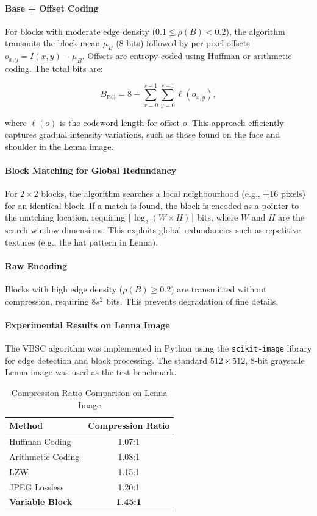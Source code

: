\paragraph{Base + Offset Coding} For blocks with moderate edge density ($0.1 \le \rho(B) < 0.2$), the algorithm\cite{Salomon1997} transmits the block mean $\mu_B$ (8 bits) followed by per‑pixel offsets $o_{x,y} = I(x,y) - \mu_B$. Offsets are entropy‑coded using Huffman or arithmetic coding. The total bits are:

\[
B_{\text{BO}} = 8 + \sum_{x=0}^{s-1}\sum_{y=0}^{s-1} \ell(o_{x,y}), 
\]

where $\ell(o)$ is the codeword length for offset $o$. This approach efficiently captures gradual intensity variations, such as those found on the face and shoulder in the Lenna image.

\paragraph{Block Matching for Global Redundancy} For $2\times2$ blocks, the algorithm searches a local neighbourhood (e.g., $\pm 16$ pixels) for an identical block. If a match is found, the block is encoded as a pointer to the matching location, requiring $\lceil \log_2(W \times H) \rceil$ bits, where $W$ and $H$ are the search window dimensions. This exploits global redundancies such as repetitive textures (e.g., the hat pattern in Lenna).

\paragraph{Raw Encoding} Blocks with high edge density ($\rho(B) \ge 0.2$) are transmitted without compression, requiring $8s^2$ bits. This prevents degradation of fine details.

\paragraph{Experimental Results on Lenna Image}

The VBSC algorithm was implemented in Python using the \texttt{scikit‑image} library for edge detection and block processing. The standard $512\times512$, 8‑bit grayscale Lenna image was used as the test benchmark.







\begin{table}[H]
\centering
\caption{Compression Ratio Comparison on Lenna Image}
\label{tab:compression_ratios}
\begin{tabular}{l c}
\hline
\textbf{Method} & \textbf{Compression Ratio} \\
\hline
Huffman Coding          & 1.07:1 \\
Arithmetic Coding       & 1.08:1 \\
LZW                     & 1.15:1 \\
JPEG Lossless           & 1.20:1 \\
\textbf{Variable Block} & \textbf{1.45:1} \\
\hline
\end{tabular}
\end{table}

